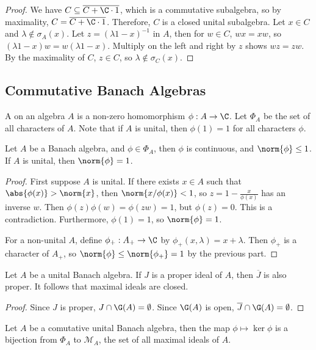 \documentclass[a4paper]{article}
\begin{document}
\begin{proof}
  We have $C\subseteq\overline{C+\C\cdot 1}$, which is a commutative subalgebra, so by maximality, $C=\overline{C+\C\cdot 1}$. Therefore, $C$ is a closed unital subalgebra. Let $x\in C$ and $\lambda\notin\sigma_A(x)$. Let $z=(\lambda 1-x)^{-1}$ in $A$, then for $w\in C$, $wx=xw$, so $(\lambda 1-x)w=w(\lambda 1-x)$. Multiply on the left and right by $z$ shows $wz=zw$. By the maximality of $C$, $z\in C$, so $\lambda\notin\sigma_C(x)$.
\end{proof}

\subsection*{Commutative Banach Algebras}
A  on an algebra $A$ is a non-zero homomorphism $\phi:A\to\C$. Let $\Phi_A$ be the set of all characters of $A$. Note that if $A$ is unital, then $\phi(1)=1$ for all characters $\phi$.

\begin{nlemma}\label{lem:CharContinuous}
  Let $A$ be a Banach algebra, and $\phi\in\Phi_A$, then $\phi$ is continuous, and $\norm{\phi}\leq 1$. If $A$ is unital, then $\norm{\phi}=1$.
\end{nlemma}

\begin{proof}
  First suppose $A$ is unital. If there exists $x\in A$ such that $\abs{\phi(x)}>\norm{x}$, then $\norm{x/\phi(x)}<1$, so $z=1-\frac{x}{\phi(x)}$ has an inverse $w$. Then $\phi(z)\phi(w)=\phi(zw)=1$, but $\phi(z)=0$. This is a contradiction. Furthermore, $\phi(1)=1$, so $\norm{\phi}=1$.

  For a non-unital $A$, define $\phi_+:A_+\to\C$ by $\phi_+(x,\lambda)=x+\lambda$. Then $\phi_+$ is a character of $A_+$, so $\norm{\phi}\leq\norm{\phi_+}=1$ by the previous part.
\end{proof}

\begin{nlemma}\label{lem:MaxIdealClosed}
  Let $A$ be a unital Banach algebra. If $J$ is a proper ideal of $A$, then $\overline{J}$ is also proper. It follows that maximal ideals are closed.
\end{nlemma}

\begin{proof}
  Since $J$ is proper, $J\cap\G(A)=\emptyset$. Since $\G(A)$ is open, $\overline{J}\cap\G(A)=\emptyset$.
\end{proof}

\begin{nthm}\label{thm:IdealCharacter}
  Let $A$ be a comutative unital Banach algebra, then the map $\phi\mapsto\ker\phi$ is a bijection from $\Phi_A$ to $\mathcal{M}_A$, the set of all maximal ideals of $A$.
\end{nthm}
\end{document}
